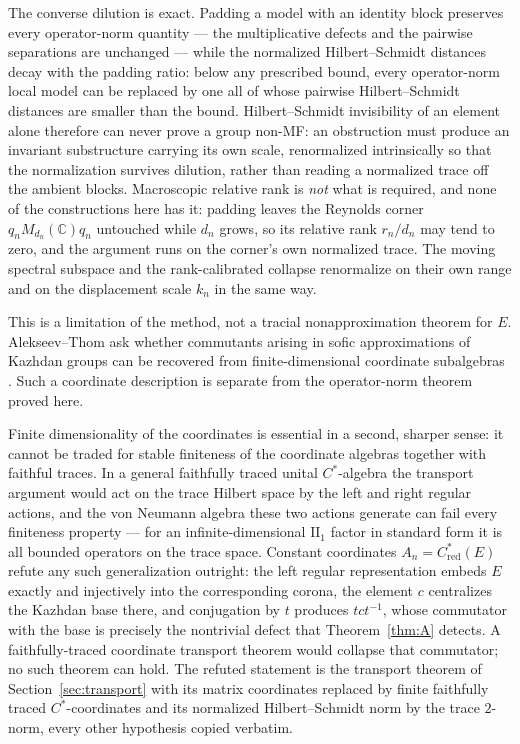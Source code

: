\documentclass[11pt]{amsart}
\newcommand{\leanverified}[2]{\ignorespaces}
\theoremstyle{definition}
\theoremstyle{remark}
\theoremstyle{plain}
\newcommand{\C}{\mathbb C}
\newcommand{\Cred}{C^*_{\mathrm{red}}}
\begin{document}
The converse dilution is exact.  Padding a model with an identity
block preserves every operator-norm quantity --- the multiplicative
defects and the pairwise separations are unchanged --- while the
normalized Hilbert--Schmidt distances decay with the padding ratio:
below any prescribed bound, every operator-norm local model can be
replaced by one all of whose pairwise Hilbert--Schmidt distances are
smaller than the bound.
\leanverified{Sofic/NormTraceGap}{GroupApproximation.NormModel.exists_hs_collapse}
Hilbert--Schmidt invisibility of an element alone therefore can never
prove a group non-MF: an obstruction must produce an invariant
substructure carrying its own scale, renormalized intrinsically so
that the normalization survives dilution, rather than reading a
normalized trace off the ambient blocks.  Macroscopic relative rank is
\emph{not} what is required, and none of the constructions here has
it: padding leaves the Reynolds corner $q_nM_{d_n}(\C)q_n$ untouched
while $d_n$ grows, so its relative rank $r_n/d_n$ may tend to zero,
and the argument runs on the corner's own normalized trace.  The
moving spectral subspace and the rank-calibrated collapse renormalize
on their own range and on the displacement scale $k_n$ in the same
way.

This is a limitation of the method, not a tracial nonapproximation
theorem for $E$.  Alekseev--Thom ask whether commutants arising in sofic
approximations of Kazhdan groups can be recovered from finite-dimensional
coordinate subalgebras \cite[Open Problem~6.2]{AlekseevThom}.  Such a
coordinate description is separate from the operator-norm theorem proved
here.

Finite dimensionality of the coordinates is essential in a second,
sharper sense: it cannot be traded for stable finiteness of the
coordinate algebras together with faithful traces.  In a general
faithfully traced unital $C^*$-algebra the transport argument would
act on the trace Hilbert space by the left and right regular actions,
and the von Neumann algebra these two actions generate can fail every
finiteness property --- for an infinite-dimensional
$\mathrm{II}_1$ factor in standard form it is all bounded operators
on the trace space.  Constant coordinates $A_n=\Cred(E)$ refute any
such generalization outright: the left regular representation embeds
$E$ exactly and injectively into the corresponding corona, the
element $c$ centralizes the Kazhdan base there, and conjugation by
$t$ produces $tct^{-1}$, whose commutator with the base is precisely
the nontrivial defect that Theorem~\ref{thm:A} detects.  A
faithfully-traced coordinate transport theorem would collapse that
commutator; no such theorem can hold.
\leanverified{Sofic/FaithfullyTracedCoordinateNoGo}{GroupApproximation.FaithfullyTracedCoordinates.manuscriptFaithfullyTracedCoordinateNoGo}
The refuted statement is the
transport theorem of Section~\ref{sec:transport} with its matrix
coordinates replaced by finite faithfully traced $C^*$-coordinates and
its normalized Hilbert--Schmidt norm by the trace $2$-norm, every other
hypothesis copied verbatim.
\end{document}
